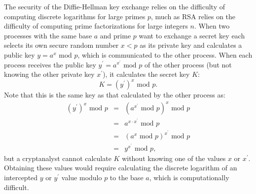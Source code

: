 The security of the Diffie-Hellman key exchange relies on the
difficulty of computing discrete logarithms for large primes $p$,
much as RSA relies on the difficulty of computing prime
factorizations for large integers $n$. When two processes with the
same base $a$ and prime $p$ want to exchange a secret key each
selects its own secure random number $x<p$ as its private key and
calculates a public key $y=a^x\mbox{ mod }p$, which is
communicated to the other process. When each process receives the
public key $y^\prime=a^{x^\prime}\mbox{ mod }p$ of the other
process (but not knowing the other private key $x^\prime$), it
calculates the secret key $K$:
\begin{displaymath}
  K = \left(y^\prime\right)^x\mbox{ mod }p.
\end{displaymath}
Note that this is the same key as that calculated by the other process as:
\begin{eqnarray*}
  \left(y^\prime\right)^x\mbox{ mod }p
  &=& \left(a^{x^\prime}\mbox{ mod }p\right)^x\mbox{ mod }p \\
  &=& a^{x\cdot x^\prime}\mbox{ mod }p \\
  &=& \left(a^x\mbox{ mod }p\right)^{x^\prime}\mbox{ mod }p \\
  &=& y^{x^\prime}\mbox{ mod }p,
\end{eqnarray*}
but a cryptanalyst cannot calculate $K$ without knowing one of the values $x$ or $x^\prime$.
Obtaining these values would require calculating the discrete logarithm of
an intercepted $y$ or $y^\prime$ value modulo $p$ to the base $a$, which is
computationally difficult.

